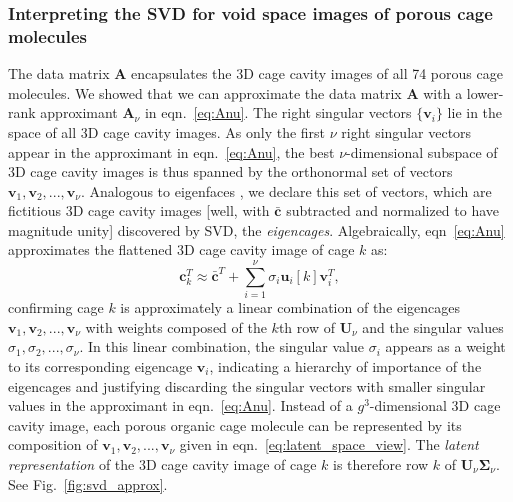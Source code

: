 \documentclass[journal=jacsat,manuscript=article,layout=traditional]{achemso}
\begin{document}
\subsubsection{Interpreting the SVD for void space images of porous cage molecules}
The data matrix $\mathbf{A}$ encapsulates the 3D cage cavity images of all 74 porous cage molecules. 
We showed that we can approximate the data matrix $\mathbf{A}$ with a lower-rank approximant $\mathbf{A}_\nu$ in eqn.~\ref{eq:Anu}. 
The right singular vectors $\{\mathbf{v}_i\}$ lie in the space of all 3D cage cavity images. As only the first $\nu$ right singular vectors appear in the approximant in eqn.~\ref{eq:Anu}, the best $\nu$-dimensional subspace of 3D cage cavity images is thus spanned by the orthonormal set of vectors $\mathbf{v}_1, \mathbf{v}_2, ..., \mathbf{v}_\nu$. Analogous to eigenfaces \cite{turk1991face,muller2004singular}, we declare this set of vectors, which are fictitious 3D cage cavity images [well, with $\bar{\mathbf{c}}$ subtracted and normalized to have magnitude unity] discovered by SVD, the \emph{eigencages}. Algebraically, eqn~\ref{eq:Anu} approximates the flattened 3D cage cavity image of cage $k$ as:
\begin{equation}
\mathbf{c}_k^T\approx \bar{\mathbf{c}}^T + \sum_{i=1}^\nu \sigma_i \mathbf{u}_i[k] \mathbf{v}_i^T,
\label{eq:latent_space_view}
\end{equation} confirming cage $k$ is approximately a linear combination of the eigencages $\mathbf{v}_1, \mathbf{v}_2, ..., \mathbf{v}_\nu$ with weights composed of the $k$th row of $\mathbf{U}_\nu$ and the singular values $\sigma_1, \sigma_2 ,...,\sigma_\nu$. In this linear combination, the singular value $\sigma_i$ appears as a weight to its corresponding eigencage $\mathbf{v}_i$, indicating a hierarchy of importance of the eigencages and justifying discarding the singular vectors with smaller singular values in the approximant in eqn.~\ref{eq:Anu}. Instead of a $g^3$-dimensional 3D cage cavity image, each porous organic cage molecule can be represented by its composition of $\mathbf{v}_1, \mathbf{v}_2, ..., \mathbf{v}_\nu$ given in eqn.~\ref{eq:latent_space_view}. The \emph{latent representation} of the 3D cage cavity image of cage $k$ is therefore row $k$ of $\mathbf{U}_\nu \mathbf{\Sigma}_\nu$. See Fig.~\ref{fig:svd_approx}.
\end{document}
